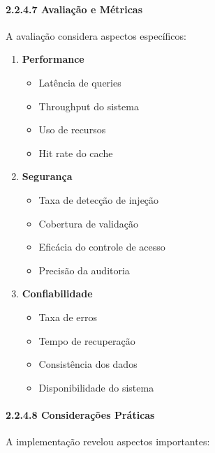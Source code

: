 \documentclass[
]{article}
\providecommand{\tightlist}{%
  \setlength{\itemsep}{0pt}\setlength{\parskip}{0pt}}
\begin{document}
\paragraph{2.2.4.7 Avaliação e
Métricas}\label{avaliauxe7uxe3o-e-muxe9tricas-2}

A avaliação considera aspectos específicos:

\begin{enumerate}
\def\labelenumi{\arabic{enumi}.}
\item
  \textbf{Performance}

  \begin{itemize}
  \tightlist
  \item
    Latência de queries
  \item
    Throughput do sistema
  \item
    Uso de recursos
  \item
    Hit rate do cache
  \end{itemize}
\item
  \textbf{Segurança}

  \begin{itemize}
  \tightlist
  \item
    Taxa de detecção de injeção
  \item
    Cobertura de validação
  \item
    Eficácia do controle de acesso
  \item
    Precisão da auditoria
  \end{itemize}
\item
  \textbf{Confiabilidade}

  \begin{itemize}
  \tightlist
  \item
    Taxa de erros
  \item
    Tempo de recuperação
  \item
    Consistência dos dados
  \item
    Disponibilidade do sistema
  \end{itemize}
\end{enumerate}

\paragraph{2.2.4.8 Considerações
Práticas}\label{considerauxe7uxf5es-pruxe1ticas-2}

A implementação revelou aspectos importantes:
\end{document}
